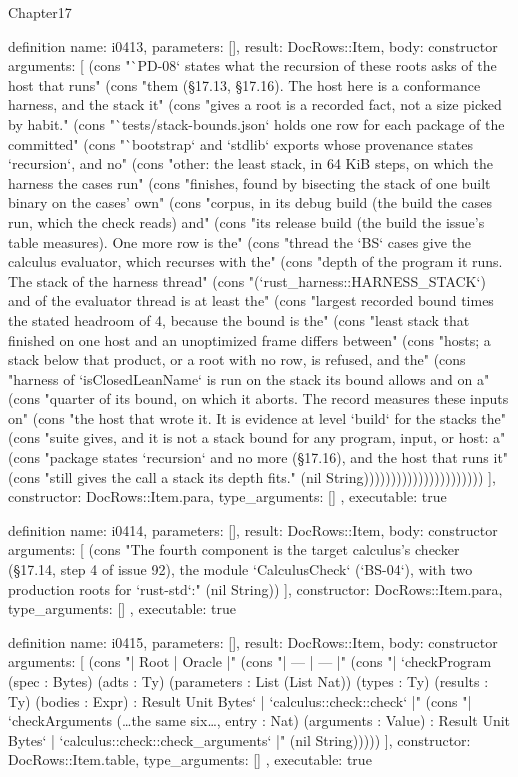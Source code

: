 \begin{lexlean}{Chapter17}
\begin{semanticmodule}
definition{
  name: i0413,
  parameters: [],
  result: DocRows::Item,
  body: constructor{
    arguments: [
      (cons "`PD-08` states what the recursion of these roots asks of the host that runs" (cons "them (§17.13, §17.16). The host here is a conformance harness, and the stack it" (cons "gives a root is a recorded fact, not a size picked by habit." (cons "`tests/stack-bounds.json` holds one row for each package of the committed" (cons "`bootstrap` and `stdlib` exports whose provenance states `recursion`, and no" (cons "other: the least stack, in 64 KiB steps, on which the harness the cases run" (cons "finishes, found by bisecting the stack of one built binary on the cases' own" (cons "corpus, in its debug build (the build the cases run, which the check reads) and" (cons "its release build (the build the issue's table measures). One more row is the" (cons "thread the `BS` cases give the calculus evaluator, which recurses with the" (cons "depth of the program it runs. The stack of the harness thread" (cons "(`rust_harness::HARNESS_STACK`) and of the evaluator thread is at least the" (cons "largest recorded bound times the stated headroom of 4, because the bound is the" (cons "least stack that finished on one host and an unoptimized frame differs between" (cons "hosts; a stack below that product, or a root with no row, is refused, and the" (cons "harness of `isClosedLeanName` is run on the stack its bound allows and on a" (cons "quarter of its bound, on which it aborts. The record measures these inputs on" (cons "the host that wrote it. It is evidence at level `build` for the stacks the" (cons "suite gives, and it is not a stack bound for any program, input, or host: a" (cons "package states `recursion` and no more (§17.16), and the host that runs it" (cons "still gives the call a stack its depth fits." (nil String))))))))))))))))))))))
    ],
    constructor: DocRows::Item.para,
    type_arguments: []
  },
  executable: true
}

definition{
  name: i0414,
  parameters: [],
  result: DocRows::Item,
  body: constructor{
    arguments: [
      (cons "The fourth component is the target calculus's checker (§17.14, step 4 of issue 92), the module `CalculusCheck` (`BS-04`), with two production roots for `rust-std`:" (nil String))
    ],
    constructor: DocRows::Item.para,
    type_arguments: []
  },
  executable: true
}

definition{
  name: i0415,
  parameters: [],
  result: DocRows::Item,
  body: constructor{
    arguments: [
      (cons "| Root | Oracle |" (cons "| --- | --- |" (cons "| `checkProgram (spec : Bytes) (adts : Ty) (parameters : List (List Nat)) (types : Ty) (results : Ty) (bodies : Expr) : Result Unit Bytes` | `calculus::check::check` |" (cons "| `checkArguments (…the same six…, entry : Nat) (arguments : Value) : Result Unit Bytes` | `calculus::check::check_arguments` |" (nil String)))))
    ],
    constructor: DocRows::Item.table,
    type_arguments: []
  },
  executable: true
}


\end{semanticmodule}
\end{lexlean}
